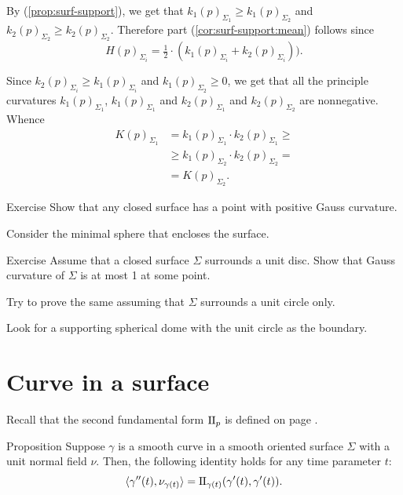 By (\ref{prop:surf-support}), we get that $k_1(p)_{\Sigma_1}\ge k_1(p)_{\Sigma_2}$ and $k_2(p)_{\Sigma_2}\ge k_2(p)_{\Sigma_2}$.
Therefore part (\ref{cor:surf-support:mean}) follows since 
\[H(p)_{\Sigma_i}=\tfrac12\cdot(k_1(p)_{\Sigma_i}+k_2(p)_{\Sigma_i})).\]


 Since $k_2(p)_{\Sigma_i}\ge k_1(p)_{\Sigma_i}$ and $k_1(p)_{\Sigma_2}\ge 0$, we get that all the principle curvatures 
$k_1(p)_{\Sigma_1}$, $k_1(p)_{\Sigma_1}$ and $k_2(p)_{\Sigma_1}$ and $k_2(p)_{\Sigma_2}$ are nonnegative.
Whence
\begin{align*}
K(p)_{\Sigma_1}&=k_1(p)_{\Sigma_1}\cdot k_2(p)_{\Sigma_1}\ge 
\\
&\ge k_1(p)_{\Sigma_2}\cdot k_2(p)_{\Sigma_2}=
\\
&=K(p)_{\Sigma_2}.
\end{align*}
\qedsf

\begin{thm}{Exercise}\label{ex:positive-gauss}
Show that any closed surface has a point with positive Gauss curvature. %
\end{thm}


Consider the minimal sphere that encloses the surface.

\begin{thm}{Exercise}\label{ex:surrounds-disc}
Assume that a closed surface $\Sigma$ surrounds a unit disc.
Show that Gauss curvature of $\Sigma$ is at most 1 at some point. 

Try to prove the same assuming that $\Sigma$ surrounds a unit circle only.
\end{thm} %

Look for a supporting spherical dome with the unit circle as the boundary.

\section*{Curve in a surface}

Recall that the second fundamental form $\mathrm{I}\hskip-.02em\mathrm{I}_p$ is defined on page \pageref{page:second fundamental form}.

\begin{thm}{Proposition}\label{prop:gamma''=II}
Suppose $\gamma$ is a smooth curve in a smooth oriented surface $\Sigma$ with a unit normal field $\nu$.
Then, the following identity holds for any time parameter $t$:
\[\langle \gamma''(t),\nu_{\gamma(t)}\rangle=\mathrm{I}\hskip-.02em\mathrm{I}_{\gamma(t)}(\gamma'(t),\gamma'(t)).\]

\end{thm}

